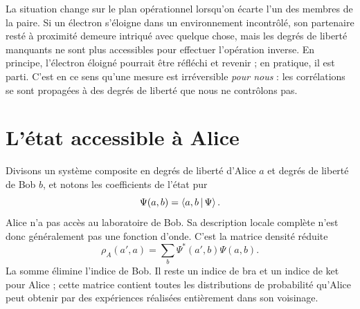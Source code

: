 La situation change sur le plan opérationnel lorsqu’on écarte l’un des membres de la paire. Si un électron s’éloigne dans un environnement incontrôlé, son partenaire resté à proximité demeure intriqué avec quelque chose, mais les degrés de liberté manquants ne sont plus accessibles pour effectuer l’opération inverse. En principe, l’électron éloigné pourrait être réfléchi et revenir ; en pratique, il est parti. C’est en ce sens qu’une mesure est irréversible \emph{pour nous} : les corrélations se sont propagées à des degrés de liberté que nous ne contrôlons pas.

\begin{classroomqa}
\end{classroomqa}

\begin{classroomqa}
\end{classroomqa}

\section{L’état accessible à Alice}

Divisons un système composite en degrés de liberté d’Alice \(a\) et degrés de liberté de Bob \(b\), et notons les coefficients de l’état pur
\begin{equation}
\Psi(a,b)=\left\langle a,b\,\middle|\,\Psi\right\rangle.
\end{equation}
Alice n’a pas accès au laboratoire de Bob. Sa description locale complète n’est donc généralement pas une fonction d’onde. C’est la matrice densité réduite
\begin{equation}
\rho_A(a',a)
=
\sum_b \Psi^*(a',b)\Psi(a,b).
\label{eq:l8-reduced-density}
\end{equation}
La somme élimine l’indice de Bob. Il reste un indice de bra et un indice de ket pour Alice ; cette matrice contient toutes les distributions de probabilité qu’Alice peut obtenir par des expériences réalisées entièrement dans son voisinage.

